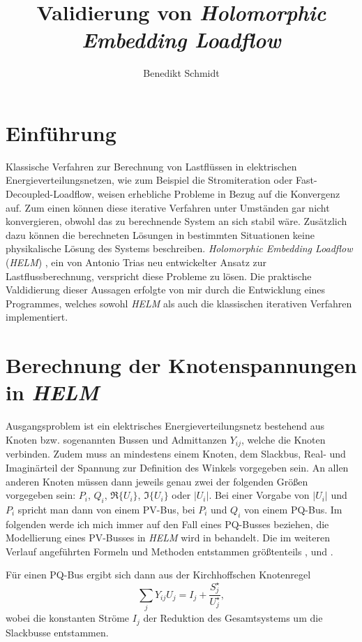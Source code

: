 \documentclass[12pt,a4paper]{article}
\author{Benedikt Schmidt}
\title{Validierung von \emph{Holomorphic Embedding Loadflow}}
\begin{document}
	\maketitle
	\newpage
	\tableofcontents
	\newpage
	
	\section{Einführung}
	Klassische Verfahren zur Berechnung von Lastflüssen in elektrischen Energieverteilungsnetzen, wie zum Beispiel die Stromiteration oder Fast-Decoupled-Loadflow, weisen erhebliche Probleme in Bezug auf die Konvergenz auf. Zum einen können diese iterative Verfahren unter Umständen gar nicht konvergieren, obwohl das zu berechnende System an sich stabil wäre. Zusätzlich dazu können die berechneten Lösungen in bestimmten Situationen keine physikalische Lösung des Systems beschreiben. \emph{Holomorphic Embedding Loadflow} (\emph{HELM}) \cite{helmIEEE}, ein von Antonio Trias neu entwickelter Ansatz zur Lastflussberechnung, verspricht diese Probleme zu lösen. Die praktische Valdidierung dieser Aussagen erfolgte von mir durch die Entwicklung eines Programmes, welches sowohl \emph{HELM} als auch die klassischen iterativen Verfahren implementiert.
	
	\section{Berechnung der Knotenspannungen in \emph{HELM}}
	Ausgangsproblem ist ein elektrisches Energieverteilungsnetz bestehend aus Knoten bzw. sogenannten Bussen und Admittanzen $Y_{ij}$, welche die Knoten verbinden. Zudem muss an mindestens einem Knoten, dem Slackbus, Real- und Imaginärteil der Spannung zur Definition des Winkels vorgegeben sein. An allen anderen Knoten müssen dann jeweils genau zwei der folgenden Größen vorgegeben sein: $P_i$, $Q_i$, $\Re\{U_i\}$, $\Im\{U_i\}$ oder $|U_i|$. Bei einer Vorgabe von $|U_i|$ und $P_i$ spricht man dann von einem PV-Bus, bei $P_i$ und $Q_i$ von einem PQ-Bus. Im folgenden werde ich mich immer auf den Fall eines PQ-Busses beziehen, die Modellierung eines PV-Busses in \emph{HELM} wird in \cite{helmPV} behandelt. Die im weiteren Verlauf angeführten Formeln und Methoden entstammen größtenteils \cite{helmIEEE}, \cite{helmPatentApr2009} und \cite{helmPatentSept2009}.
	
	Für einen PQ-Bus ergibt sich dann aus der Kirchhoffschen Knotenregel
	\begin{equation}
		\sum_j Y_{ij} U_{j} = I_j + \frac{S_j^\star}{U_j^\star},
		\label{eq:loadflow}
	\end{equation}
	wobei die konstanten Ströme $I_j$ der Reduktion des Gesamtsystems um die Slackbusse entstammen.
	
\end{document}
